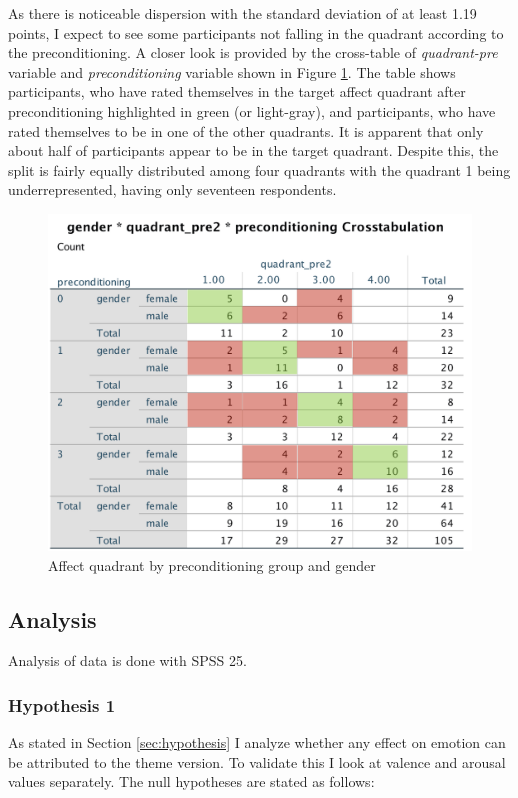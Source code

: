 		 As there is noticeable dispersion with the standard deviation of at least 1.19 points, I expect to see some participants not falling in the quadrant according to the preconditioning. A closer look is provided by the cross-table of \textit{quadrant-pre} variable and \textit{preconditioning} variable shown in Figure \ref{fig:preconditioningsuccessbygender}. The table shows participants, who have rated themselves in the target affect quadrant after preconditioning highlighted in green (or light-gray), and participants, who have rated themselves to be in one of the other quadrants. It is apparent that only about half of participants appear to be in the target quadrant. Despite this, the split is fairly equally distributed among four quadrants with the quadrant 1 being underrepresented, having only seventeen respondents.
		
\begin{figure}[h!]
	\centering
	\includegraphics[width=0.7\linewidth]{graphics/preconditioning_success_by_gender}
	\caption{Affect quadrant by preconditioning group and gender}
	\label{fig:preconditioningsuccessbygender}
\end{figure}


	\subsection{Analysis}
	
	Analysis of data is done with SPSS 25.
	
	\subsubsection{Hypothesis 1}
	
	As stated in Section \ref{sec:hypothesis} I analyze whether any effect on emotion can be attributed to the theme version. To validate this I look at valence and arousal values separately. The null hypotheses are stated as follows:
	
